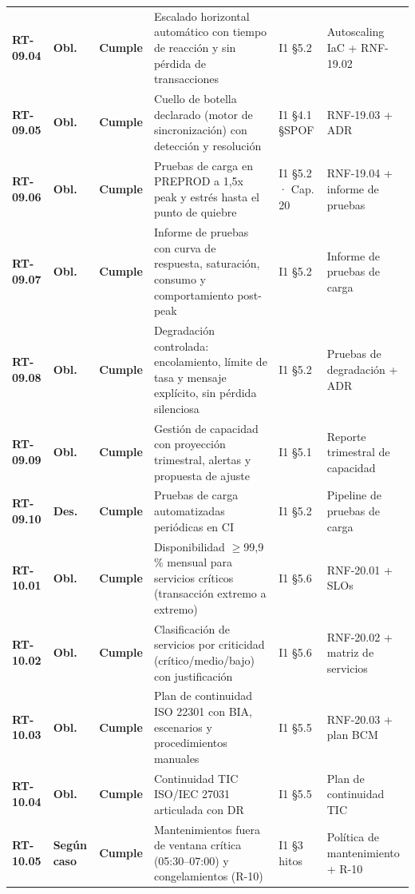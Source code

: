 \begin{small}
\begin{longtable}{@{}p{1.35cm} p{1.15cm} p{1.15cm} p{4.6cm} p{2.35cm} p{3.8cm}@{}}
\textbf{RT-09.04} & \textbf{Obl.} & \textbf{Cumple} & Escalado horizontal autom\'atico con tiempo de reacci\'on y sin p\'erdida de transacciones & I1 §5.2 & Autoscaling IaC + RNF-19.02 \\
\textbf{RT-09.05} & \textbf{Obl.} & \textbf{Cumple} & Cuello de botella declarado (motor de sincronizaci\'on) con detecci\'on y resoluci\'on & I1 §4.1 §SPOF & RNF-19.03 + ADR \\
\textbf{RT-09.06} & \textbf{Obl.} & \textbf{Cumple} & Pruebas de carga en PREPROD a 1,5x peak y estr\'es hasta el punto de quiebre & I1 §5.2 · Cap. 20 & RNF-19.04 + informe de pruebas \\
\textbf{RT-09.07} & \textbf{Obl.} & \textbf{Cumple} & Informe de pruebas con curva de respuesta, saturaci\'on, consumo y comportamiento post-peak & I1 §5.2 & Informe de pruebas de carga \\
\textbf{RT-09.08} & \textbf{Obl.} & \textbf{Cumple} & Degradaci\'on controlada: encolamiento, l\'imite de tasa y mensaje expl\'icito, sin p\'erdida silenciosa & I1 §5.2 & Pruebas de degradaci\'on + ADR \\
\textbf{RT-09.09} & \textbf{Obl.} & \textbf{Cumple} & Gesti\'on de capacidad con proyecci\'on trimestral, alertas y propuesta de ajuste & I1 §5.1 & Reporte trimestral de capacidad \\
\textbf{RT-09.10} & \textbf{Des.} & \textbf{Cumple} & Pruebas de carga automatizadas peri\'odicas en CI & I1 §5.2 & Pipeline de pruebas de carga \\
\textbf{RT-10.01} & \textbf{Obl.} & \textbf{Cumple} & Disponibilidad $\geq$99,9 \% mensual para servicios cr\'iticos (transacci\'on extremo a extremo) & I1 §5.6 & RNF-20.01 + SLOs \\
\textbf{RT-10.02} & \textbf{Obl.} & \textbf{Cumple} & Clasificaci\'on de servicios por criticidad (cr\'itico/medio/bajo) con justificaci\'on & I1 §5.6 & RNF-20.02 + matriz de servicios \\
\textbf{RT-10.03} & \textbf{Obl.} & \textbf{Cumple} & Plan de continuidad ISO 22301 con BIA, escenarios y procedimientos manuales & I1 §5.5 & RNF-20.03 + plan BCM \\
\textbf{RT-10.04} & \textbf{Obl.} & \textbf{Cumple} & Continuidad TIC ISO/IEC 27031 articulada con DR & I1 §5.5 & Plan de continuidad TIC \\
\textbf{RT-10.05} & \textbf{Según caso} & \textbf{Cumple} & Mantenimientos fuera de ventana cr\'itica (05:30–07:00) y congelamientos (R-10) & I1 §3 hitos & Pol\'itica de mantenimiento + R-10 \\

\end{longtable}
\end{small}
